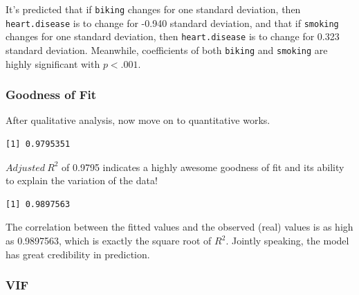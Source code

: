 \documentclass[
]{ctexart}
\newenvironment{Shaded}{\begin{snugshade}}{\end{snugshade}}
\newcommand{\AttributeTok}[1]{\textcolor[rgb]{0.13,0.29,0.53}{#1}}
\newcommand{\FunctionTok}[1]{\textcolor[rgb]{0.13,0.29,0.53}{\textbf{#1}}}
\newcommand{\NormalTok}[1]{#1}
\newcommand{\OtherTok}[1]{\textcolor[rgb]{0.56,0.35,0.01}{#1}}
\newcommand{\SpecialCharTok}[1]{\textcolor[rgb]{0.81,0.36,0.00}{\textbf{#1}}}
\begin{document}
It's predicted that if \texttt{biking} changes for one standard
deviation, then \texttt{heart.disease} is to change for -0.940 standard
deviation, and that if \texttt{smoking} changes for one standard
deviation, then \texttt{heart.disease} is to change for 0.323 standard
deviation. Meanwhile, coefficients of both \texttt{biking} and
\texttt{smoking} are highly significant with \(p<.001\).

\hypertarget{goodness-of-fit-1}{%
\subsubsection{Goodness of Fit}\label{goodness-of-fit-1}}

After qualitative analysis, now move on to quantitative works.

\begin{Shaded}
\end{Shaded}

\begin{verbatim}
[1] 0.9795351
\end{verbatim}

\(Adjusted\ R^2\) of 0.9795 indicates a highly awesome goodness of fit
and its ability to explain the variation of the data!

\begin{Shaded}
\end{Shaded}

\begin{verbatim}
[1] 0.9897563
\end{verbatim}

The correlation between the fitted values and the observed (real) values
is as high as 0.9897563, which is exactly the square root of \(R^2\).
Jointly speaking, the model has great credibility in prediction.

\hypertarget{vif}{%
\subsubsection{VIF}\label{vif}}
\end{document}
